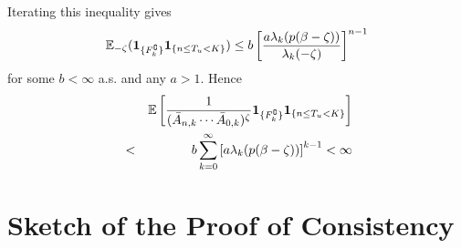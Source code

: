 \documentclass{beamer}
\begin{document}
\begin{frame}
  Iterating this inequality gives
  \[
  \mathbb{E}_{-\zeta}(\mathbf{1}_{\{F_k^\complement\}} \mathbf{1}_{\{n \leq T_u < K\}}) \leq b \left[
    {
      a \lambda_k(p(\beta - \zeta))
      \over
      \lambda_k(-\zeta)
    }
  \right]^{n-1}
  \]
  for some $b < \infty$ a.s. and any $a > 1$. Hence
  \begin{eqnarray*}
    && \mathbb{E} \left[
      {
        1\over
        (\bar A_{n,k} \cdots \bar A_{0,k})^\zeta
      } \mathbf{1}_{\{F_k^\complement\}} \mathbf{1}_{\{n \leq T_u < K\}} \right] \\
    &<& 
    b \sum_{k=0}^\infty \left[
      {
        a \lambda_k(p(\beta - \zeta))
      }
    \right]^{k-1} < \infty
  \end{eqnarray*}
\end{frame}

\section{Sketch of the Proof of Consistency}

\end{document}
